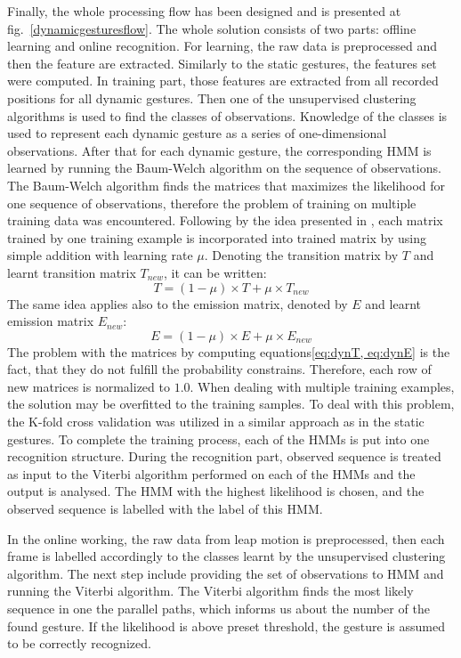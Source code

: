 Finally, the whole processing flow has been designed and is presented at fig.~\ref{dynamicgesturesflow}.
The whole solution consists of two parts: offline learning and online recognition.
For learning, the raw data is preprocessed and then the feature are extracted. 
Similarly to the static gestures, the features set were computed. 
In training part, those features are extracted from all recorded positions for all dynamic gestures.
Then one of the unsupervised clustering algorithms is used to find the classes of observations.
Knowledge of the classes is used to represent each dynamic gesture as a series of one-dimensional observations.
After that for each dynamic gesture, the corresponding HMM is learned by running the Baum-Welch algorithm on the sequence of observations.
The Baum-Welch algorithm finds the matrices that maximizes the likelihood for one sequence of observations, therefore the problem of training on multiple training data was encountered.
Following by the idea presented in \cite{hmmtutorial}, each matrix trained by one training example is incorporated into trained matrix by using simple addition with learning rate $\mu$.
Denoting the transition matrix by $T$ and learnt transition matrix $T_{new}$, it can be written:
\begin{equation}\label{eq:dynT}
T = (1-\mu) \times T + \mu \times T_{new}
\end{equation}
The same idea applies also to the emission matrix, denoted by $E$ and learnt emission matrix $E_{new}$:
\begin{equation}\label{eq:dynE}
E = (1-\mu) \times E + \mu \times E_{new}
\end{equation}
The problem with the matrices by computing equations\ref{eq:dynT, eq:dynE} is the fact, that they do not fulfill the probability constrains.
Therefore, each row of new matrices is normalized to $1.0$.
When dealing with multiple training examples, the solution may be overfitted to the training samples.
To deal with this problem, the K-fold cross validation was utilized in a similar approach as in the static gestures.
To complete the training process, each of the HMMs is put into one recognition structure. 
During the recognition part, observed sequence is treated as input to the Viterbi algorithm performed on each of the HMMs and the output is analysed.
The HMM with the highest likelihood is chosen, and the observed sequence is labelled with the label of this HMM.

In the online working, the raw data from leap motion is preprocessed, then each frame is labelled accordingly to the classes learnt by the unsupervised clustering algorithm.
The next step include providing the set of observations to HMM and running the Viterbi algorithm.
The Viterbi algorithm finds the most likely sequence in one the parallel paths, which informs us about the number of the found gesture. 
If the likelihood is above preset threshold, the gesture is assumed to be correctly recognized.


